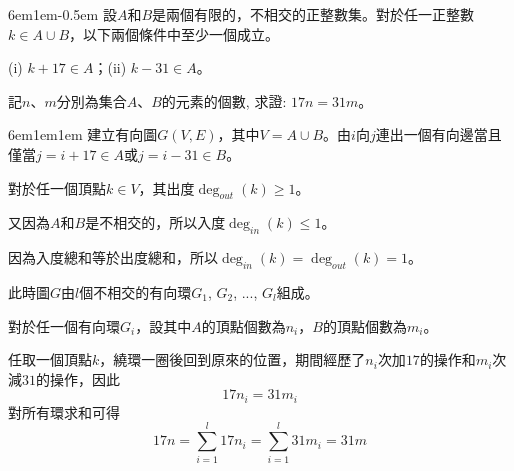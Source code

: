 \documentclass[12pt]{article}
\def\pA{-0.5em}
\def\Ap{1em}
\begin{document}
\begin{mybox}[Problem 5]{6em}{1em}{\pA}
    設$A$和$B$是兩個有限的，不相交的正整數集。對於任一正整數$k\in A\cup B$，以下兩個條件中至少一個成立。
    
    (i) $k + 17 \in A$；(ii) $k - 31 \in A$。
    
    記$n$、$m$分別為集合$A$、$B$的元素的個數, 求證: $17n = 31m$。
\end{mybox}
\begin{mybox}[Answer]{6em}{1em}{\Ap}
    建立有向圖$G\left(V,E\right)$，其中$V=A\cup B$。由$i$向$j$連出一個有向邊當且僅當$j=i+17\in A$或$j=i-31\in B$。

    對於任一個頂點$k\in V$，其出度$\deg_{out}\left(k\right)\geq 1$。
    
    又因為$A$和$B$是不相交的，所以入度$\deg_{in}\left(k\right)\leq 1$。

    因為入度總和等於出度總和，所以$\deg_{in}\left(k\right)=\deg_{out}\left(k\right)=1$。

    此時圖$G$由$l$個不相交的有向環$G_1$, $G_2$, ..., $G_l$組成。

    對於任一個有向環$G_i$，設其中$A$的頂點個數為$n_i$，$B$的頂點個數為$m_i$。
    
    任取一個頂點$k$，繞環一圈後回到原來的位置，期間經歷了$n_i$次加$17$的操作和$m_i$次減$31$的操作，因此
    $$17n_i = 31m_i$$
    對所有環求和可得
    $$17n=\sum_{i=1}^{l}{17n_i}=\sum_{i=1}^{l}{31m_i}= 31m$$
\end{mybox}
\end{document}
